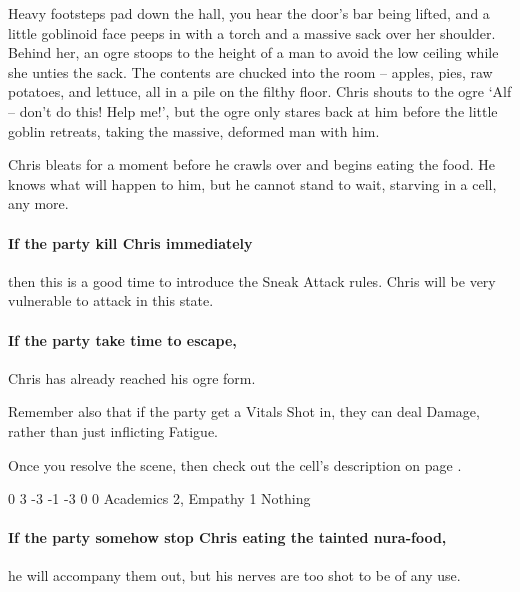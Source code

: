\begin{multicols}{2}
\begin{boxtext}

	Heavy footsteps pad down the hall, you hear the door's bar being lifted, and a little goblinoid face peeps in with a torch and a massive sack over her shoulder.
	Behind her, an ogre stoops to the height of a man to avoid the low ceiling while she unties the sack.
	The contents are chucked into the room -- apples, pies, raw potatoes, and lettuce, all in a pile on the filthy floor.
	Chris shouts to the ogre `Alf -- don't do this! Help me!', but the ogre only stares back at him before the little goblin retreats, taking the massive, deformed man with him.

\end{boxtext}

Chris bleats for a moment before he crawls over and begins eating the food.
He knows what will happen to him, but he cannot stand to wait, starving in a cell, any more.

\paragraph{If the party kill Chris immediately}
then this is a good time to introduce the Sneak Attack rules.
Chris will be very vulnerable to attack in this state.

\paragraph{If the party take time to escape,}
Chris has already reached his ogre form.

Remember also that if the party get a Vitals Shot in, they can deal Damage, rather than just inflicting Fatigue.

Once you resolve the scene, then check out the cell's description on page \pageref{entrycell}.

{0}%
{3}%
{{-3}%
{-1}%
{-3}}%
{0}%
{0}%
{Academics 2, Empathy 1}%
{Nothing}%
{}

\paragraph{If the party somehow stop Chris eating the tainted nura-food,}
he will accompany them out, but his nerves are too shot to be of any use.

\label{alf}


\end{multicols}
